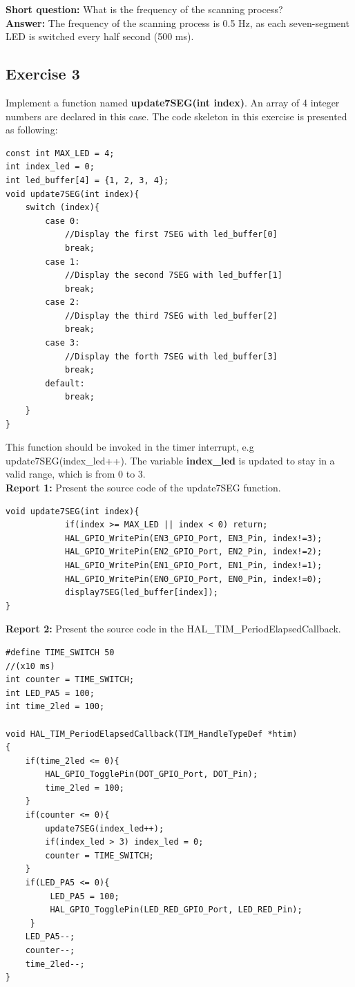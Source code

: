 \documentclass[twoside, final]{hcmut_report}
\begin{document}
\textbf{Short question: } What is the frequency of the scanning process?\\
\textbf{Answer: } The frequency of the scanning process is 0.5 Hz, as each seven-segment LED is switched every half second (500 ms).
\subsection{Exercise 3}
Implement a function named \textbf{update7SEG(int index)}. An array of 4 integer numbers are declared in this case. The code skeleton in this exercise is presented as following:

\begin{lstlisting}[caption=An example for your source code]
const int MAX_LED = 4;
int index_led = 0;
int led_buffer[4] = {1, 2, 3, 4};
void update7SEG(int index){
    switch (index){
        case 0:
            //Display the first 7SEG with led_buffer[0]
            break;
        case 1:
            //Display the second 7SEG with led_buffer[1]
            break;
        case 2:
            //Display the third 7SEG with led_buffer[2]
            break;
        case 3:
            //Display the forth 7SEG with led_buffer[3]
            break;
        default:
            break;
    }
}
\end{lstlisting}

This function should be invoked in the timer interrupt, e.g update7SEG(index\_led++). The variable \textbf{index\_led} is updated to stay in a valid range, which is from 0 to 3. \\

\textbf{Report 1: } Present the source code of the update7SEG function. \\

\begin{lstlisting}[caption=The update7SEG function]
void update7SEG(int index){
			if(index >= MAX_LED || index < 0) return;
			HAL_GPIO_WritePin(EN3_GPIO_Port, EN3_Pin, index!=3);
			HAL_GPIO_WritePin(EN2_GPIO_Port, EN2_Pin, index!=2);
			HAL_GPIO_WritePin(EN1_GPIO_Port, EN1_Pin, index!=1);
			HAL_GPIO_WritePin(EN0_GPIO_Port, EN0_Pin, index!=0);
			display7SEG(led_buffer[index]);
}
\end{lstlisting}

\textbf{Report 2: } Present the source code in the HAL\_TIM\_PeriodElapsedCallback.\\

\begin{lstlisting}[caption=The update7SEG function]
#define TIME_SWITCH 50
//(x10 ms)
int counter = TIME_SWITCH;
int LED_PA5 = 100;
int time_2led = 100;

void HAL_TIM_PeriodElapsedCallback(TIM_HandleTypeDef *htim)
{
	if(time_2led <= 0){
		HAL_GPIO_TogglePin(DOT_GPIO_Port, DOT_Pin);
		time_2led = 100;
	}
	if(counter <= 0){
		update7SEG(index_led++);
		if(index_led > 3) index_led = 0;
		counter = TIME_SWITCH;
	}
	if(LED_PA5 <= 0){
		 LED_PA5 = 100;
		 HAL_GPIO_TogglePin(LED_RED_GPIO_Port, LED_RED_Pin);
	 }
	LED_PA5--;
	counter--;
	time_2led--;
}
\end{lstlisting}
\end{document}
